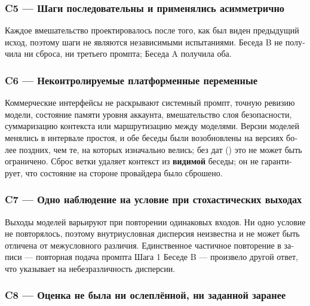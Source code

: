 \begin{russian}
\subsubsection*{C5 — Шаги последовательны и применялись асимметрично}
\label{sec:ru:x-c5}

Каждое вмешательство проектировалось после того, как был виден предыдущий исход, поэтому шаги не являются независимыми испытаниями. Беседа B не получила ни сброса, ни третьего промпта; Беседа A получила оба.


\subsubsection*{C6 — Неконтролируемые платформенные переменные}
\label{sec:ru:x-c6}

Коммерческие интерфейсы не раскрывают системный промпт, точную ревизию модели, состояние памяти уровня аккаунта, вмешательство слоя безопасности, суммаризацию контекста или маршрутизацию между моделями. Версии моделей менялись в интервале простоя, и обе беседы были возобновлены на версиях более поздних, чем те, на которых изначально велись; без дат () это не может быть ограничено. Сброс ветки удаляет контекст из \textbf{видимой} беседы; он не гарантирует, что состояние на стороне провайдера было сброшено.


\subsubsection*{C7 — Одно наблюдение на условие при стохастических выходах}
\label{sec:ru:x-c7}

Выходы моделей варьируют при повторении одинаковых входов. Ни одно условие не повторялось, поэтому внутриусловная дисперсия неизвестна и не может быть отличена от межусловного различия. Единственное частичное повторение в записи — повторная подача промпта Шага 1 Беседе B — произвело другой ответ, что указывает на небезразличность дисперсии.


\subsubsection*{C8 — Оценка не была ни ослеплённой, ни заданной заранее}
\label{sec:ru:x-c8}


\end{russian}
